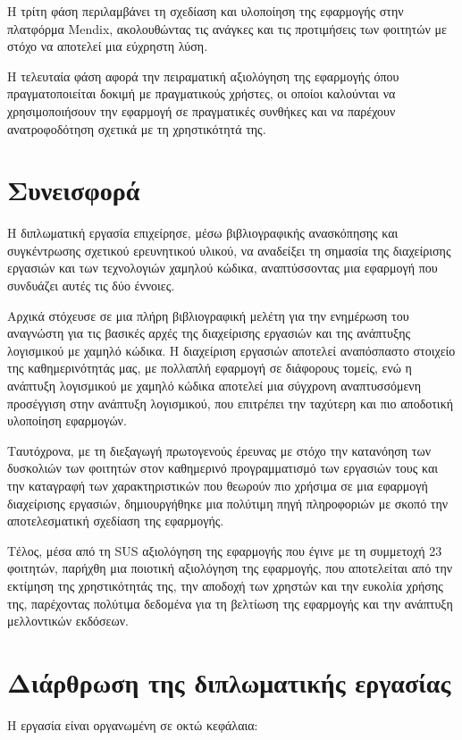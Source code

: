 		Η τρίτη φάση περιλαμβάνει τη σχεδίαση και υλοποίηση της εφαρμογής στην πλατφόρμα Mendix, ακολουθώντας τις ανάγκες και τις προτιμήσεις των φοιτητών με στόχο να αποτελεί μια εύχρηστη λύση.

		Η τελευταία φάση αφορά την πειραματική αξιολόγηση της εφαρμογής όπου πραγματοποιείται δοκιμή με πραγματικούς χρήστες, οι οποίοι καλούνται να χρησιμοποιήσουν την εφαρμογή σε πραγματικές συνθήκες και να παρέχουν ανατροφοδότηση σχετικά με τη χρηστικότητά της.


	\section{Συνεισφορά}
		Η διπλωματική εργασία επιχείρησε, μέσω βιβλιογραφικής ανασκόπησης και συγκέντρωσης σχετικού ερευνητικού υλικού, να αναδείξει τη σημασία της διαχείρισης εργασιών και των τεχνολογιών χαμηλού κώδικα, αναπτύσσοντας μια εφαρμογή που συνδυάζει αυτές τις δύο έννοιες.

		Αρχικά στόχευσε σε μια πλήρη βιβλιογραφική μελέτη για την ενημέρωση του αναγνώστη για τις βασικές αρχές της διαχείρισης εργασιών και της ανάπτυξης λογισμικού με χαμηλό κώδικα. Η διαχείριση εργασιών αποτελεί αναπόσπαστο στοιχείο της καθημερινότητάς μας, με πολλαπλή εφαρμογή σε διάφορους τομείς, ενώ η ανάπτυξη λογισμικού με χαμηλό κώδικα αποτελεί μια σύγχρονη αναπτυσσόμενη προσέγγιση στην ανάπτυξη λογισμικού, που επιτρέπει την ταχύτερη και πιο αποδοτική υλοποίηση εφαρμογών.

		Ταυτόχρονα, με τη διεξαγωγή πρωτογενούς έρευνας με στόχο την κατανόηση των δυσκολιών των φοιτητών στον καθημερινό προγραμματισμό των εργασιών τους και την καταγραφή των χαρακτηριστικών που θεωρούν πιο χρήσιμα σε μια εφαρμογή διαχείρισης εργασιών, δημιουργήθηκε μια πολύτιμη πηγή πληροφοριών με σκοπό την αποτελεσματική σχεδίαση της εφαρμογής.

		Τέλος, μέσα από τη SUS αξιολόγηση της εφαρμογής που έγινε με τη συμμετοχή 23 φοιτητών, παρήχθη μια ποιοτική αξιολόγηση της εφαρμογής, που αποτελείται από την εκτίμηση της χρηστικότητάς της, την αποδοχή των χρηστών και την ευκολία χρήσης της, παρέχοντας πολύτιμα δεδομένα για τη βελτίωση της εφαρμογής και την ανάπτυξη μελλοντικών εκδόσεων.


	\section{Διάρθρωση της διπλωματικής εργασίας}
		Η εργασία είναι οργανωμένη σε οκτώ κεφάλαια:

